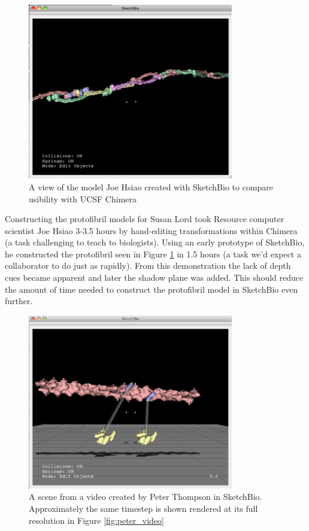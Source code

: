 \documentclass{article} %
\begin{document}
\begin{figure}[h]
\centering
\includegraphics[width=0.8\textwidth]{joe_test.png}
\caption{A view of the model Joe Hsiao created with SketchBio to compare usibility with UCSF Chimera}
\label{fig:joe_test}
\end{figure}

Constructing the protofibril models for Susan Lord took Resource computer scientist Joe Hsiao 3-3.5 hours by hand-editing transformations within Chimera (a task challenging to teach to biologists).  Using an early prototype of SketchBio, he constructed the protofibril seen in Figure \ref{fig:joe_test} in 1.5 hours (a task we'd expect a collaborator to do just as rapidly).  From this demonstration the lack of depth cues became apparent and later the shadow plane was added.  This should reduce the amount of time needed to construct the protofibril model in SketchBio even further.

\begin{figure}[h]
\centering
\includegraphics[width=0.8\textwidth]{peter_model.png}
\caption{A scene from a video created by Peter Thompson in SketchBio.  Approximately the same timestep is shown rendered at its full resolution in Figure \ref{fig:peter_video}}
\label{fig:peter_model}
\end{figure}
\end{document}
